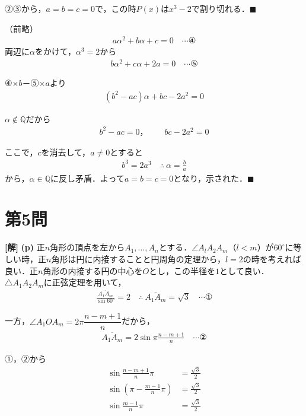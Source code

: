 \documentclass[../main.tex]{subfiles}
\begin{document}
②③から，$a=b=c=0$で，この時$P(x)$は$x^3-2$で割り切れる．$\blacksquare$

\bigskip
\noindent{\bf [解2]}
（前略）
\begin{align*}
a\alpha^2+b\alpha+c=0\quad\cdots④
\end{align*}
両辺に$\alpha$をかけて，$\alpha^3=2$から
\begin{align*}
b\alpha^2+c\alpha+2a=0\quad\cdots⑤
\end{align*}

④$\times b$－⑤$\times a$より
\begin{align*}
(b^2-ac)\alpha+bc-2a^2=0
\end{align*}

$\alpha\notin\mathbb Q$だから
\begin{align*}
b^2-ac=0，\qquad bc-2a^2=0
\end{align*}

ここで，$c$を消去して，$a\ne0$とすると
\begin{align*}
b^3=2a^3\quad\therefore\ \alpha=\frac ba
\end{align*}
から，$\alpha\in\mathbb Q$に反し矛盾．よって$a=b=c=0$となり，示された．$\blacksquare$

\newpage

\section*{第5問}

{\bf [解]}
\textbf{(p)} 正$n$角形の頂点を左から$A_1,\ldots,A_n$とする．$\angle A_lA_2A_m$（$l<m$）が$60^\circ$に等しい時，正$n$角形は円に内接することと円周角の定理から，$l=2$の時を考えれば良い．正$n$角形の内接する円の中心を$O$とし，この半径を$1$として良い．$\triangle A_1A_2A_m$に正弦定理を用いて，
\begin{align*}
\frac{\overline{A_1A_m}}{\sin60^\circ}=2\quad\therefore\ \overline{A_1A_m}=\sqrt3\quad\cdots①
\end{align*}

一方，$\angle A_1OA_m=2\pi\dfrac{n-m+1}n$だから，
\begin{align*}
\overline{A_1A_m}=2\sin\pi\frac{n-m+1}n\quad\cdots②
\end{align*}

①，②から
\begin{align*}
\sin\frac{n-m+1}n\pi&=\frac{\sqrt3}2\\
\sin\left(\pi-\frac{m-1}n\pi\right)&=\frac{\sqrt3}2\\
\sin\frac{m-1}n\pi&=\frac{\sqrt3}2
\end{align*}
\end{document}

